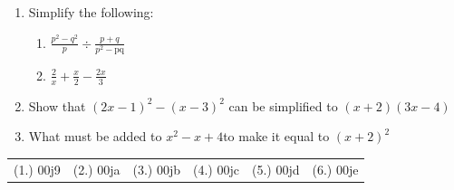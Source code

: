 \begin{enumerate}[noitemsep, label=\textbf{\arabic*}. ]
\item Simplify the following:
\label{m39392*eip-id1153}\begin{enumerate}[noitemsep, label=\textbf{\alph*}. ] 
            \item $\frac{{p}^{2}-{q}^{2}}{p}÷\frac{p+q}{{p}^{2}-\mathrm{pq}}$\item $\frac{2}{x}+\frac{x}{2}-\frac{2x}{3}$\end{enumerate}
\label{m39392*uid56}\item Show that ${\left(2x-1\right)}^{2}-{\left(x-3\right)}^{2}$ can be simplified to $\left(x+2\right)\left(3x-4\right)$
\newline
\newline
\label{m39392*uid57}\item What must be added to ${x}^{2}-x+4$\hspace{1ex}to make it equal to ${\left(x+2\right)}^{2}$
\newline
\newline
\end{enumerate}
  \label{m39392**end}
  \label{d4e6ddcad4e2d9e383c4732da6858c66**end}
\practiceinfo
\par 
 \par \begin{tabular}[h]{cccccc}
 (1.) 00j9&  (2.) 00ja&  (3.) 00jb&  (4.) 00jc&  (5.) 00jd&  (6.) 00je& \end{tabular}
